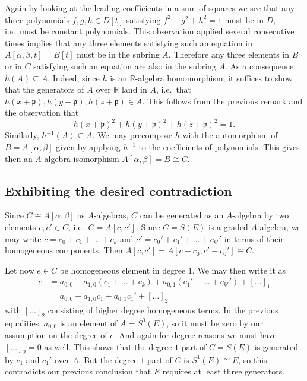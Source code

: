 \documentclass[A4paper, 12pt, british, reqno]{amsart}
\newcommand{\R}{\mathbb{R}} %
\newcommand{\p}{\mathfrak{p}}
\theoremstyle{plain}
\theoremstyle{definition}
\theoremstyle{remark}
\theoremstyle{plain}
\theoremstyle{definition}
\theoremstyle{remark}
\theoremstyle{plain}
\theoremstyle{definition}
\theoremstyle{remark}
\begin{document}
Again by looking at the leading coefficients in a sum of squares we see that any three polynomials $f,g,h\in D[t]$ satisfying $f^{2}+g^{2}+h^{2}=1$ must be in $D$, i.e.~must be constant polynomials.
This observation applied several consecutive times implies that any three elements satisfying such an equation in $A[\alpha,\beta,t]=B[t]$ must be in the subring $A$.
Therefore any three elements in $B$ or in $C$ satisfying such an equation are also in the subring $A$.
As a consequence, $h(A)\subseteq A$.
Indeed, since $h$ is an $\R$-algebra homomorphism, it suffices to show that the generators of $A$ over $\R$ land in $A$, i.e.~that $h(x+\p),h(y+\p),h(z+\p)\in A$.
This follows from the previous remark and the observation that
\[ h(x+\p)^{2}+h(y+\p)^{2}+h(z+\p)^{2}=1. \]
Similarly, $h^{-1}(A)\subseteq A$.
We may precompose $h$ with the automorphism of $B=A[\alpha,\beta]$ given by applying $h^{-1}$ to the coefficients of polynomials.
This gives then an $A$-algebra isomorphism $A[\alpha,\beta]=B\cong C$.

\subsection{Exhibiting the desired contradiction}
Since $C\cong A[\alpha,\beta]$ as $A$-algebras, $C$ can be generated as an $A$-algebra by two elements $c,c'\in C$, i.e.~$C=A[c,c']$.
Since $C=S(E)$ is a graded $A$-algebra, we may write $c=c_{0}+c_{1}+\ldots+c_{k}$ and $c'=c_{0}'+c_{1}'+\ldots+c_{k'}'$ in terms of their homogeneous components.
Then $A[c,c']=A[c-c_{0},c'-c_{0}']\cong C$.

Let now $e\in C$ be homogeneous element in degree $1$.
We may then write it as
\begin{align*}
    e & = a_{0,0}+a_{1,0}(c_{1}+\ldots+c_{k})+a_{0,1}(c_{1}'+\ldots+c_{k'}')+ [\ldots]_{1} \\
    & = a_{0,0}+a_{1,0}c_{1}+a_{0,1}c_{1}'+[\ldots]_{2}
\end{align*}
with $[\ldots]_{2}$ consisting of higher degree homogeneous terms.
In the previous equalities, $a_{0,0}$ is an element of $A=S^{0}(E)$, so it must be zero by our assumption on the degree of $e$.
And again for degree reasons we must have $[\ldots]_{2}=0$ as well.
This shows that the degree $1$ part of $C=S(E)$ is generated by $c_{1}$ and $c_{1}'$ over $A$.
But the degree $1$ part of $C$ is $S^{1}(E)\cong E$, so this contradicts our previous conclusion that $E$ requires at least three generators.



\vfill
\end{document}
